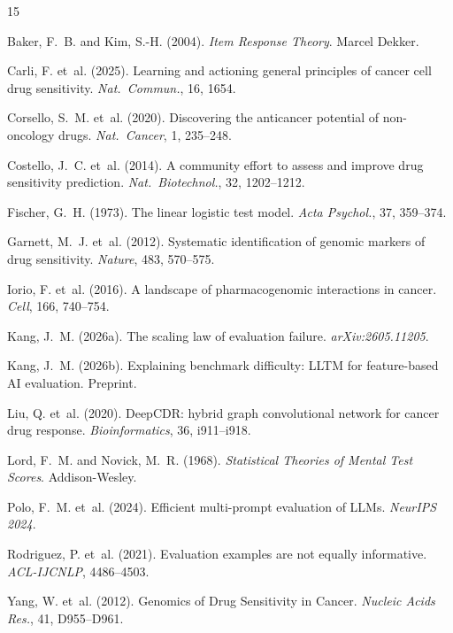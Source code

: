 \documentclass[11pt]{article}
\begin{document}

\begin{thebibliography}{15}

Baker, F.~B. and Kim, S.-H. (2004). \emph{Item Response Theory}. Marcel Dekker.

Carli, F. et~al. (2025). Learning and actioning general principles of cancer cell drug sensitivity. \emph{Nat.\ Commun.}, 16, 1654.

Corsello, S.~M. et~al. (2020). Discovering the anticancer potential of non-oncology drugs. \emph{Nat.\ Cancer}, 1, 235--248.

Costello, J.~C. et~al. (2014). A community effort to assess and improve drug sensitivity prediction. \emph{Nat.\ Biotechnol.}, 32, 1202--1212.

Fischer, G.~H. (1973). The linear logistic test model. \emph{Acta Psychol.}, 37, 359--374.

Garnett, M.~J. et~al. (2012). Systematic identification of genomic markers of drug sensitivity. \emph{Nature}, 483, 570--575.

Iorio, F. et~al. (2016). A landscape of pharmacogenomic interactions in cancer. \emph{Cell}, 166, 740--754.

Kang, J.~M. (2026a). The scaling law of evaluation failure. \emph{arXiv:2605.11205}.

Kang, J.~M. (2026b). Explaining benchmark difficulty: LLTM for feature-based AI evaluation. Preprint.

Liu, Q. et~al. (2020). DeepCDR: hybrid graph convolutional network for cancer drug response. \emph{Bioinformatics}, 36, i911--i918.

Lord, F.~M. and Novick, M.~R. (1968). \emph{Statistical Theories of Mental Test Scores}. Addison-Wesley.

Polo, F.~M. et~al. (2024). Efficient multi-prompt evaluation of LLMs. \emph{NeurIPS 2024}.

Rodriguez, P. et~al. (2021). Evaluation examples are not equally informative. \emph{ACL-IJCNLP}, 4486--4503.

Yang, W. et~al. (2012). Genomics of Drug Sensitivity in Cancer. \emph{Nucleic Acids Res.}, 41, D955--D961.

\end{thebibliography}
\end{document}
